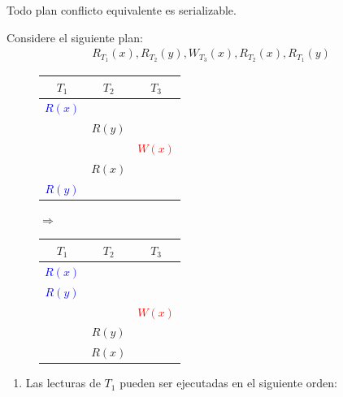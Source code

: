 \documentclass{templateNote}
\begin{document}
\begin{itemize}
\begin{itemize}
        Todo plan conflicto equivalente es serializable.

        Considere el siguiente plan:
        \begin{align*}
            R_{T_1}(x), R_{T_2}(y), W_{T_3}(x), R_{T_2}(x), R_{T_1}(y)
        \end{align*}

        \begin{figure}[H]
            \begin{minipage}{0.5\textwidth}
                \centering
                \begin{tabular}{|c|c|c|}
                    \hline
                    \textbf{$T_1$} & \textbf{$T_2$} & \textbf{$T_3$} \\ \hline
                    \textcolor{blue}{$R(x)$} & & \\
                    & \textcolor{green!80!black}{$R(y)$} & \\
                    & & \textcolor{red}{$W(x)$} \\
                    & \textcolor{green!80!black}{$R(x)$} & \\
                    \textcolor{blue}{$R(y)$} & & \\ \hline
                \end{tabular}
            \end{minipage}
            $\Rightarrow$
            \begin{minipage}{0.5\textwidth}
                \centering
                \begin{tabular}{|c|c|c|}
                    \hline
                    \textbf{$T_1$} & \textbf{$T_2$} & \textbf{$T_3$} \\ \hline
                    \textcolor{blue}{$R(x)$} & & \\
                    \textcolor{blue}{$R(y)$} & & \\
                    & & \textcolor{red}{$W(x)$} \\
                    & \textcolor{green!80!black}{$R(y)$} & \\
                    & \textcolor{green!80!black}{$R(x)$} & \\ \hline
                \end{tabular}
            \end{minipage}
        \end{figure}

        \begin{enumerate}
            \item Las lecturas de $T_1$ pueden ser ejecutadas en el siguiente orden:
            

\end{enumerate}
\end{itemize}
\end{itemize}
\end{document}
